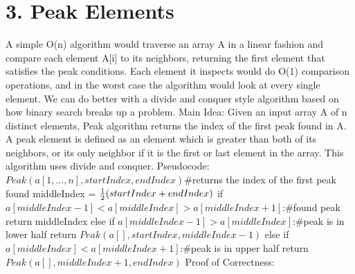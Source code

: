 \documentclass[11pt]{article}
\begin{document}
\section*{3. Peak Elements}
A simple O(n) algorithm would traverse an array A in a linear fashion and compare each element A[i] to its neighbors, returning the first element that satisfies the peak conditions. Each element it inspects would do O(1) comparison operations, and in the worst case the algorithm would look at every single element.
\newline
We can do better with a divide and conquer style algorithm based on how binary search breaks up a problem.
\newline
Main Idea:\newline
Given an input array A of n distinct elements, Peak algorithm returns the index of the first peak found in A. A peak element is defined as an element which is greater than both of its neighbors, or its only neighbor if it is the first or last element in the array. This algorithm uses divide and conquer.
\newline
\newline
Pseudocode:
\newline
$Peak(	a[1,...,n], startIndex, endIndex)$\indent\#returns the index of the first peak found\newline
\indent middleIndex = ${1 \over 2}(startIndex + endIndex)$\newline
\indent if $a[middleIndex-1]<a[middleIndex]>a[middleIndex+1]$:\indent \#found peak\newline
\indent \indent return middleIndex\newline
\indent else if $a[middleIndex-1]>a[middleIndex]$:\indent \#peak is in lower half\newline
\indent \indent return $Peak(a[],startIndex, middleIndex-1)$\newline
\indent else if $a[middleIndex]<a[middleIndex+1]$:\indent \#peak is in upper half\newline
\indent \indent return $Peak(a[],middleIndex+1,endIndex)$\newline
\newline
Proof of Correctness:\newline
\end{document}
